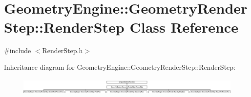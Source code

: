 \hypertarget{class_geometry_engine_1_1_geometry_render_step_1_1_render_step}{}\section{Geometry\+Engine\+::Geometry\+Render\+Step\+::Render\+Step Class Reference}
\label{class_geometry_engine_1_1_geometry_render_step_1_1_render_step}


{\ttfamily \#include $<$Render\+Step.\+h$>$}

Inheritance diagram for Geometry\+Engine\+::Geometry\+Render\+Step\+::Render\+Step\+:\begin{figure}[H]
\begin{center}
\leavevmode
\includegraphics[height=0.879581cm]{class_geometry_engine_1_1_geometry_render_step_1_1_render_step}
\end{center}
\end{figure}
